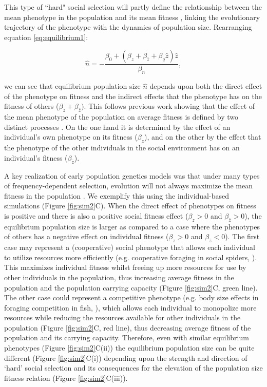 \documentclass{article}
\begin{document}
This type of “hard" social selection will partly define the relationship between the mean phenotype in the population and its mean fitness \citep{Lande1976}, linking the evolutionary trajectory of the phenotype with the dynamics of population size. Rearranging equation \ref{eq:equilibrium1}:

\begin{equation}
\hat{n} = -\frac{\beta_{0} + (\beta_{z} + \beta_{\bar{z}} +  \beta_{q}\hat{z})\hat{z}}{\beta_{n}},
\end{equation}

\noindent we can see that equilibrium population size $\hat{n}$ depends upon both the direct effect of the phenotype on fitness and the indirect effects that the phenotype has on the fitness of others ($\beta_{z} + \beta_{\bar{z}})$. This follows previous work showing that the effect of the mean phenotype of the population on average fitness is defined by two distinct processes \citep{Engen2020, Lande2007, Lande1976}. On the one hand it is determined by the effect of an individual's own phenotype on its fitness ($\beta_{z}$), and on the other by the effect that the phenotype of the other individuals in the social environment has on an individual's fitness ($\beta_{\bar{z}}$).

A key realization of early population genetics models was that under many types of frequency-dependent selection, evolution will not always maximize the mean fitness in the population \citep{Fisher1930, Wright1948}. We exemplify this using the individual-based simulations (Figure \ref{fig:sim2}C). When the direct effect of phenotypes on fitness is positive and there is also a positive social fitness effect ($\beta_{z}>0$ and $\beta_{\bar{z}}>0$), the equilibrium population size is larger as compared to a case where the phenotypes of others has a negative effect on individual fitness ($\beta_{z}>0$ and $\beta_{\bar{z}}<0$). The first case may represent a (cooperative) social phenotype that allows each individual to utilize resources more efficiently (e.g. cooperative foraging in social spiders, \cite{Majer2018}). This maximizes individual fitness whilst freeing up more resources for use by other individuals in the population, thus increasing average fitness in the population and the population carrying capacity (Figure \ref{fig:sim2}C, green line). The other case could represent a competitive phenotype (e.g. body size effects in foraging competition in fish, \cite{Ward2006}), which allows each individual to monopolize more resources while reducing the resources available for other individuals in the population (Figure \ref{fig:sim2}C, red line), thus decreasing average fitness of the population and its carrying capacity. Therefore, even with similar equilibrium phenotypes (Figure \ref{fig:sim2}C(ii)) the equilibrium population size can be quite different (Figure \ref{fig:sim2}C(i)) depending upon the strength and direction of `hard' social selection and its consequences for the elevation of the population size fitness relation (Figure \ref{fig:sim2}C(iii)). 
\end{document}
